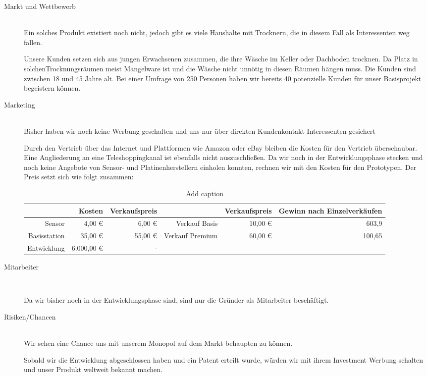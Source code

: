 \begin{description}
\begin{description}
		\end{description}
\item [Markt und Wettbewerb] \hfill \\
		Ein solches Produkt existiert noch nicht, jedoch gibt es viele Haushalte mit Trocknern, die in diesem Fall als Interessenten weg fallen.
		\begin{description}
			Unsere Kunden setzen sich aus jungen Erwachsenen zusammen, die ihre Wäsche im Keller oder Dachboden trocknen. Da Platz in solchenTrocknungsräumen meist Mangelware ist und die Wäsche nicht unnötig in diesen Räumen hängen muss. Die Kunden sind zwischen 18 und 45 Jahre alt. Bei einer Umfrage von 250 Personen haben wir bereits 40 potenzielle Kunden für unser Basisprojekt begeistern können.
		\end{description}
	\item [Marketing] \hfill \\
		Bisher haben wir noch keine Werbung geschalten und uns nur über direkten Kundenkontakt Interessenten gesichert
		\begin{description}
			Durch den Vertrieb über das Internet und Plattformen wie Amazon oder eBay bleiben die Kosten für den Vertrieb überschaubar. Eine Angliederung an eine Teleshoppingkanal ist ebenfalls nicht auszuschließen. Da wir noch in der Entwicklungsphase stecken und noch keine Angebote von Sensor- und Platinenherstellern einholen konnten, rechnen wir mit den Kosten für den Prototypen. Der Preis setzt sich wie folgt zusammen:
\begin{table}[htbp]
  \centering
  \caption{Add caption}
    \begin{tabular}{rrrrrr}
    \toprule
          & Kosten & Verkaufspreis &       & Verkaufspreis & Gewinn nach Einzelverkäufen \\
    \midrule
    Sensor & 4,00 € & 6,00 € & Verkauf Basis & 10,00 € & 603,9 \\
    Basisstation & 35,00 € & 55,00 € & Verkauf Premium & 60,00 € & 100,65 \\
    Entwicklung & 6.000,00 € & -     &       &       &  \\
    \bottomrule
    \end{tabular}%
  \label{tab:addlabel}%
\end{table}%
		\end{description}
\item [Mitarbeiter] \hfill \\
		\begin{description}
			Da wir bisher noch in der Entwicklungsphase sind, sind nur die Gründer als Mitarbeiter beschäftigt. 
		\end{description}
\item [Risiken/Chancen] \hfill \\
	Wir sehen eine Chance uns mit unserem Monopol auf dem Markt behaupten zu können. 
		\begin{description}
			Sobald wir die Entwicklung abgeschlossen haben und ein Patent erteilt wurde, würden wir mit ihrem Investment Werbung schalten und unser Produkt weltweit bekannt machen.
		\end{description}
\end{description}
